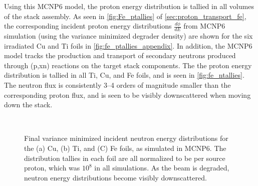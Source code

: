 Using this MCNP6 model, the proton energy distribution is tallied in all volumes of the stack assembly.
As seen in \autoref{fig:Fe_ptallies} of \autoref{sec:proton_transport_fe}, the corresponding incident proton  energy distributions $\frac{d\phi}{dE}$ from MCNP6 simulation (using the variance minimized degrader density) are shown for the six irradiated Cu and Ti  foils in \autoref{fig:fe_ptallies_appendix}. 
In addition, the MCNP6 model tracks the production and transport of secondary neutrons produced through (p,xn) reactions on the target stack components.
The the proton energy distribution is tallied in all Ti, Cu, and Fe foils, and is seen in \autoref{fig:fe_ntallies}. 
The neutron flux is consistently 3--4 orders of magnitude smaller than the corresponding proton flux, and is seen to be visibly  downscattered when moving down the stack.

\begin{figure}
    \centering    
    \\
    \caption{ Final variance minimized incident neutron energy distributions for the (a) Cu, (b) Ti, and (C) Fe foils, as simulated in MCNP6. The distribution tallies in each foil are all normalized to be per source proton, which was $10^8$ in all simulations. As the beam is degraded, neutron energy distributions become visibly downscattered.}
     \label{fig:fe_ntallies}
\end{figure}





